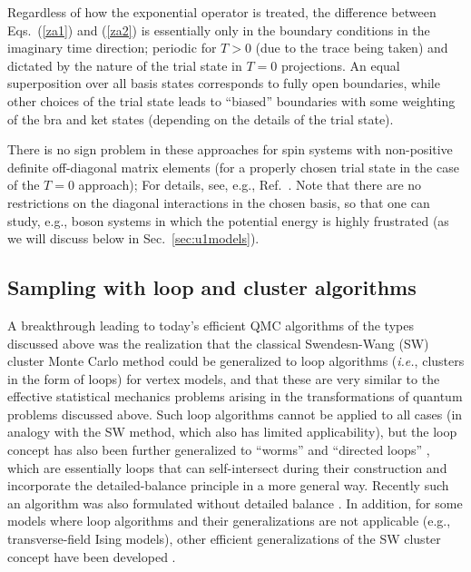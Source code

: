 \documentclass[range]{ar2e}
\begin{document}
Regardless of how the exponential operator is treated, the difference between Eqs.~(\ref{za1}) and (\ref{za2}) is essentially only in the boundary 
conditions in the imaginary time direction; periodic for $T>0$ (due to the trace being taken) and dictated by the nature of the trial state in $T=0$ 
projections. An equal superposition over all basis states corresponds to fully open boundaries, while other choices of the trial state leads to ``biased''
boundaries with some weighting of the bra and ket states (depending on the details of the trial state). 

There is no sign problem in these approaches for spin systems with non-positive definite off-diagonal matrix elements (for a properly chosen trial state in the 
case of the $T=0$ approach); For details, see, e.g., Ref.~\cite{Henelius00}. Note that there are no restrictions on the diagonal interactions in the chosen basis, 
so that one can study, e.g., boson systems in which the potential energy is highly frustrated (as we will discuss below in Sec.~\ref{sec:u1models}).


\subsection{Sampling with loop and cluster algorithms}

A breakthrough leading to today's efficient QMC algorithms of the types discussed above
was the realization \cite{Evertz93} that the classical Swendesn-Wang (SW) cluster 
Monte Carlo method \cite{Swendsen88} could be generalized to loop algorithms ({\em i.e.}, clusters in the form of loops) for vertex models, and that 
these are very similar to the effective statistical mechanics problems arising in the transformations of quantum problems discussed above. Such 
loop algorithms cannot be applied to all cases (in analogy with the SW method, which also has limited applicability), but the loop concept has also been further 
generalized to ``worms'' \cite{Prokofev96,Prokofev98, WormA} and ``directed loops'' \cite{Sandvik99,Syljuasen02}, which are essentially loops that can self-intersect
during their construction and incorporate the detailed-balance principle in a more general way. Recently such an algorithm was also formulated without
detailed balance \cite{Suwa10}. In addition, for some models where loop algorithms and their generalizations are not applicable (e.g., transverse-field 
Ising models), other efficient generalizations of the SW cluster concept have been developed \cite{Rieger99,Sandvik03}.
\end{document}
